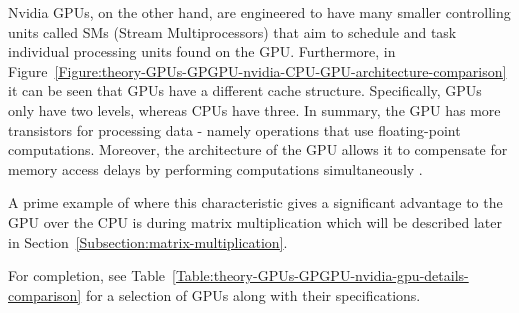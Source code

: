 Nvidia GPUs, on the other hand, are engineered to have many smaller controlling units called SMs (Stream Multiprocessors) that aim to schedule and task individual processing units found on the GPU. Furthermore, in Figure~\ref{Figure:theory-GPUs-GPGPU-nvidia-CPU-GPU-architecture-comparison} it can be seen that GPUs have a different cache structure. Specifically, GPUs only have two levels, whereas CPUs have three. In summary, the GPU has more transistors for processing data - namely operations that use floating-point computations. Moreover, the architecture of the GPU allows it to compensate for memory access delays by performing computations simultaneously \cite{NVIDIAMay2022}.
\par A prime example of where this characteristic gives a significant advantage to the GPU over the CPU is during matrix multiplication which will be described later in Section~\ref{Subsection:matrix-multiplication}.
\par For completion, see Table~\ref{Table:theory-GPUs-GPGPU-nvidia-gpu-details-comparison} for a selection of GPUs along with their specifications.


